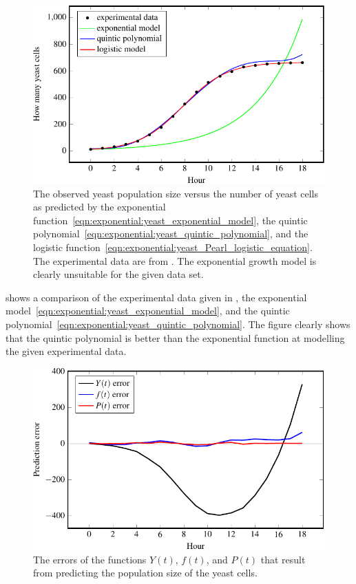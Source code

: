 \documentclass[a4paper,oneside,12pt]{article}
\begin{document}
\begin{problem}
{\begin{solution}
\begin{figure}[!htbp]
\centering
\includegraphics[scale=1.1]{image/11/yeast.pdf}
\caption{%
  The observed yeast population size versus the number of yeast cells
  as predicted by the exponential
  function~\eqref{eqn:exponential:yeast_exponential_model}, the
  quintic
  polynomial~\eqref{eqn:exponential:yeast_quintic_polynomial}, and the
  logistic
  function~\eqref{eqn:exponential:yeast_Pearl_logistic_equation}.  The
  experimental data are from .  The
  exponential growth model is clearly unsuitable for the given data
  set.
}
\label{fig:exponential:yeast_data_versus_models}
\end{figure}

 shows a comparison
of the experimental data given in , the
exponential model~\eqref{eqn:exponential:yeast_exponential_model}, and
the quintic
polynomial~\eqref{eqn:exponential:yeast_quintic_polynomial}.  The
figure clearly shows that the quintic polynomial is better than the
exponential function at modelling the given experimental data.

\begin{figure}[!htbp]
\centering
\includegraphics[scale=1.1]{image/11/yeast-error.pdf}
\caption{%
  The errors of the functions $Y(t)$, $f(t)$, and $P(t)$ that result
  from predicting the population size of the yeast cells.
}
\label{fig:exponential:yeast_error_analysis}
\end{figure}


\end{solution}}
\end{problem}
\end{document}
